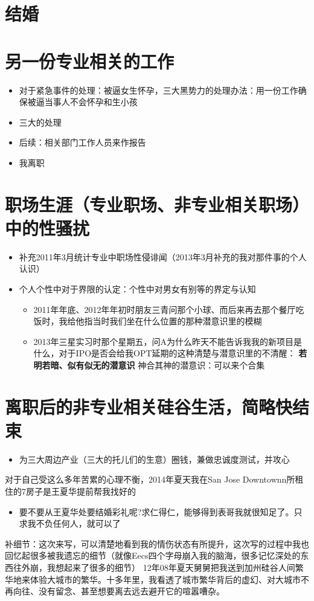 \documentclass[9pt, b5paper]{article}
\begin{document}
\section{结婚}
\label{sec:org0de0b2b}

\section{另一份专业相关的工作}
\label{sec:org36bcb94}
\begin{itemize}
\item 对于紧急事件的处理：被逼女生怀孕，三大黑势力的处理办法：用一份工作确保被逼当事人不会怀孕和生小孩
\item 三大的处理
\item 后续：相关部门工作人员来作报告
\item 我离职
\end{itemize}

\section{职场生涯（专业职场、非专业相关职场）中的性骚扰}
\label{sec:org0351d43}
\begin{itemize}
\item 补充2011年3月统计专业中职场性侵诽闻（2013年3月补充的我对那件事的个人认识）
\item 个人个性中对于界限的认定：个性中对男女有别等的界定与认知
\begin{itemize}
\item 2011年年底、2012年年初时朋友三青问那个小球、而后来再去那个餐厅吃饭时，我给他指当时我们坐在什么位置的那种潜意识里的模糊
\item 2013年三星实习时那个星期五，问A为什么昨天不能告诉我我的新项目是什么，对于IPO是否会给我OPT延期的这种清楚与潜意识里的不清醒： \textbf{若明若暗、似有似无的潜意识} 神合其神的潜意识：可以来个合集
\end{itemize}
\end{itemize}

\section{离职后的非专业相关硅谷生活，简略快结束}
\label{sec:org7b2cb32}
\begin{itemize}
\item 为三大周边产业（三大的托儿们的生意）圈钱，兼做忠诚度测试，并攻心
\end{itemize}

对于自己受这么多年苦累的心理不衡，2014年夏天我在San Jose Downtownn所租住的7房子是王夏华提前帮我找好的
\begin{itemize}
\item 要不要从王夏华处要结婚彩礼呢?求仁得仁，能够得到表哥我就很知足了。只求我不负任何人，就可以了
\end{itemize}
补细节：这次来写，可以清楚地看到我的情伤状态有所提升，这次写的过程中我也回忆起很多被我遗忘的细节（就像Eecs四个字母崩入我的脑海，很多记忆深处的东西往外崩，我想起来了很多的细节）
12年08年夏天舅舅把我送到加州硅谷人间繁华地来体验大城市的繁华。十多年里，我看透了城市繁华背后的虚幻、对大城市不再向往、没有留念、甚至想要离去远去避开它的喧嚣嘈杂。
\end{document}
